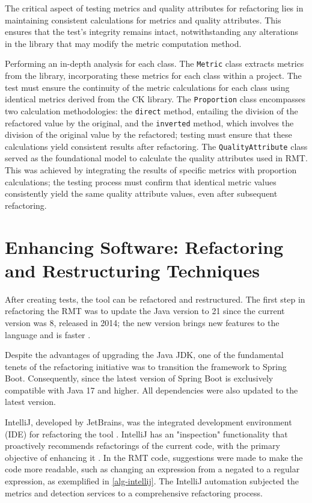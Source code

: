 The critical aspect of testing metrics and quality attributes for refactoring lies in maintaining consistent calculations for metrics and quality attributes. This ensures that the test's integrity remains intact, notwithstanding any alterations in the library that may modify the metric computation method.

Performing an in-depth analysis for each class. The \texttt{Metric} class extracts metrics from the \textcite{ck} library, incorporating these metrics for each class within a project. The test must ensure the continuity of the metric calculations for each class using identical metrics derived from the CK library. The \texttt{Proportion} class encompasses two calculation methodologies: the \texttt{direct} method, entailing the division of the refactored value by the original, and the \texttt{inverted} method, which involves the division of the original value by the refactored; testing must ensure that these calculations yield consistent results after refactoring. The \texttt{QualityAttribute} class served as the foundational model to calculate the quality attributes used in RMT. This was achieved by integrating the results of specific metrics with proportion calculations; the testing process must confirm that identical metric values consistently yield the same quality attribute values, even after subsequent refactoring.

\section{Enhancing Software: Refactoring and Restructuring Techniques}
\label{sec-enhancing}

After creating tests, the tool can be refactored and restructured. The first step in refactoring the RMT was to update the Java version to 21 since the current version was 8, released in 2014; the new version brings new features to the language and is faster \cite{java21}. 

Despite the advantages of upgrading the Java JDK, one of the fundamental tenets of the refactoring initiative was to transition the framework to Spring Boot. Consequently, since the latest version of Spring Boot is exclusively compatible with Java 17 and higher. All dependencies were also updated to the latest version.

IntelliJ, developed by JetBrains, was the integrated development environment (IDE) for refactoring the tool \cite{intellij}. IntelliJ has an "inspection" functionality that proactively recommends refactorings of the current code, with the primary objective of enhancing it \cite{intellij-inspection}. In the RMT code, suggestions were made to make the code more readable, such as changing an expression from a negated to a regular expression, as exemplified in \cref{alg-intellij}. The IntelliJ automation subjected the metrics and detection services to a comprehensive refactoring process.

